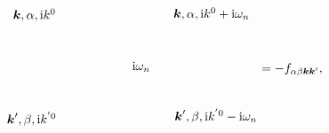 \begin{equation}
\begin{gathered}
\begin{tikzpicture}[x=0.75pt,y=0.75pt,yscale=-1,xscale=1]
            \draw (117.72,80.8) node [anchor=east] [inner sep=0.75pt]    {$\boldsymbol{k} ,\alpha ,\mathrm{i} k^{0}$};
            \draw (241.22,79.47) node [anchor=west] [inner sep=0.75pt]    {$\boldsymbol{k} ,\alpha ,\mathrm{i} k^{0} +\mathrm{i} \omega _{n}$};
            \draw (118.17,192.51) node [anchor=east] [inner sep=0.75pt]    {$\boldsymbol{k} ',\beta ,\mathrm{i} k^{'0}$};
            \draw (242.46,189.26) node [anchor=west] [inner sep=0.75pt]    {$\boldsymbol{k} ',\beta ,\mathrm{i} k^{'0} -\mathrm{i} \omega _{n}$};
            \draw (197,130.4) node [anchor=north west][inner sep=0.75pt]    {$\mathrm{i} \omega _{n}$};
            \end{tikzpicture}
    \end{gathered} = - f_{\alpha \beta \vb*{k} \vb*{k}'},
    \label{eq:fermi-liquid-vertex}
\end{equation}